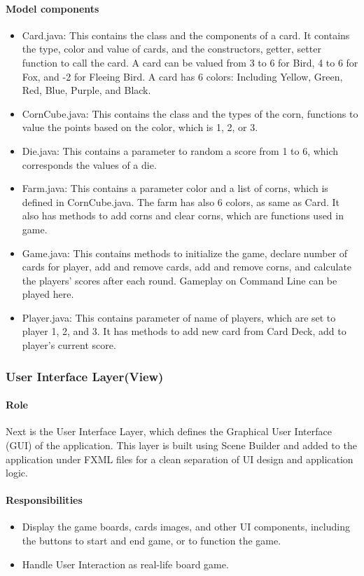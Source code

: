 \documentclass[conference]{IEEEtran}
\begin{document}
\paragraph{Model components}
\begin{itemize}
    \item Card.java: This contains the class and the components of a card. It contains the type, color and value of cards, and the constructors, getter, setter function to call the card. A card can be valued from 3 to 6 for Bird, 4 to 6 for Fox, and -2 for Fleeing Bird. A card has 6 colors: Including Yellow, Green, Red, Blue, Purple, and Black.
    \item CornCube.java: This contains the class and the types of the corn, functions to value the points based on the color, which is 1, 2, or 3. 
    \item Die.java: This contains a parameter to random a score from 1 to 6, which corresponds the values of a die.
    \item Farm.java: This contains a parameter color and a list of corns, which is defined in CornCube.java. The farm has also 6 colors, as same as Card. It also has methods to add corns and clear corns, which are functions used in game.
    \item Game.java: This contains methods to initialize the game, declare number of cards for player, add and remove cards, add and remove corns, and calculate the players' scores after each round. Gameplay on Command Line can be played here.
    \item Player.java: This contains parameter of name of players, which are set to player 1, 2, and 3. It has methods to add new card from Card Deck, add to player's current score.
\end{itemize}

\subsubsection{User Interface Layer(View)}
\paragraph{Role}
Next is the User Interface Layer, which defines the Graphical User Interface (GUI) of the application. This layer is built using Scene Builder and added to the application under FXML files for a clean separation of UI design and application logic.

\paragraph{Responsibilities}
\begin{itemize}
    \item Display the game boards, cards images, and other UI components, including the buttons to start and end game, or to function the game.
    \item Handle User Interaction as real-life board game.
\end{itemize}
\end{document}
